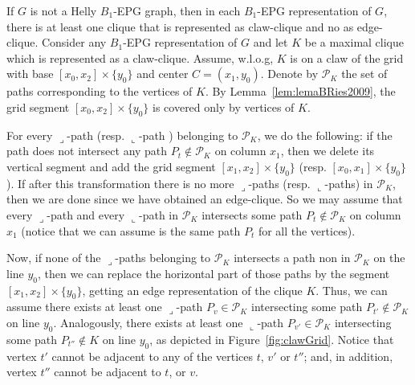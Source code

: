 \documentclass[9pt]{entcs}
\begin{document}
\begin{pf}
If $G$ is not a Helly $B_1$-EPG graph, then in each $B_1$-EPG representation of $G$, there is at least one clique that is represented as claw-clique and no as edge-clique. Consider any $B_1$-EPG  representation of $G$  and let $K$ be a maximal clique  which is represented as a claw-clique. Assume, w.l.o.g,  $K$ is on a claw of the grid with base $[x_0, x_2]\times\{y_0\}$ and center $C = (x_1, y_0)$. Denote by  $\mathcal{P}_K$ the set of paths corresponding to the vertices of $K$.  By Lemma~\ref{lem:lemaBRies2009},  %
the grid segment $[x_0, x_2]\times\{y_0\}$ is covered only by vertices of $K$. %


 For every ${\displaystyle \lrcorner}$-path %
 (resp. ${\displaystyle \llcorner}$-path 
 ) belonging to $\mathcal{P}_K$, we do the following: if %
 the path does not intersect any path $P_t \notin\mathcal{P}_K$ on column $x_1$, then we delete its vertical segment and add the grid segment $[x_1, x_2]\times\{y_0\}$ (resp. $[x_0, x_1]\times\{y_0\}$). If after this transformation there is no more ${\displaystyle \lrcorner}$-paths (resp. ${\displaystyle \llcorner}$-paths) in $\mathcal{P}_K$, then we are done since we have obtained an edge-clique. So we may assume that
 every ${\displaystyle \lrcorner}$-path   and every ${\displaystyle \llcorner}$-path  in $ \mathcal{P}_K$ intersects some path $P_t \notin \mathcal{P}_K$   on column $x_1$ (notice that we can assume is the same path $P_t$ for all the vertices). 
 
 Now, if none of the ${\displaystyle \lrcorner}$-paths belonging to $\mathcal{P}_K$ intersects  a path non in  $ \mathcal{P}_K$ on the line $y_0$, then we can replace the horizontal part of those paths by the segment $[x_1,x_2]\times \{y_0\}$, getting an edge representation of the clique $K$. Thus, we can assume there exists
 at least one ${\displaystyle \lrcorner}$-path $P_{v} \in \mathcal{P}_K$ intersecting some path  $P_{t'} \notin \mathcal{P}_K$ on line $y_0$. Analogously, there exists
 at least one ${\displaystyle \llcorner}$-path $P_{v'} \in \mathcal{P}_K$ intersecting some path  $P_{t''} \notin K$ on line $y_0$, as depicted in Figure~\ref{fig:clawGrid}. Notice that vertex $t'$ cannot be adjacent to any of the vertices $t$, $v'$ or $t''$; and, in addition, vertex $t''$ cannot
 be adjacent to   $t$,  or $v$.
 

\end{pf}
\end{document}

